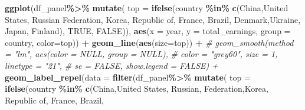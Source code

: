 \documentclass[
]{article}
\newenvironment{Shaded}{\begin{snugshade}}{\end{snugshade}}
\newcommand{\AttributeTok}[1]{\textcolor[rgb]{0.13,0.29,0.53}{#1}}
\newcommand{\CommentTok}[1]{\textcolor[rgb]{0.56,0.35,0.01}{\textit{#1}}}
\newcommand{\ConstantTok}[1]{\textcolor[rgb]{0.56,0.35,0.01}{#1}}
\newcommand{\FunctionTok}[1]{\textcolor[rgb]{0.13,0.29,0.53}{\textbf{#1}}}
\newcommand{\NormalTok}[1]{#1}
\newcommand{\SpecialCharTok}[1]{\textcolor[rgb]{0.81,0.36,0.00}{\textbf{#1}}}
\newcommand{\StringTok}[1]{\textcolor[rgb]{0.31,0.60,0.02}{#1}}
\begin{document}
\begin{Shaded}
\begin{Highlighting}[]
\FunctionTok{ggplot}\NormalTok{(df\_panel}\SpecialCharTok{\%\textgreater{}\%}
         \FunctionTok{mutate}\NormalTok{(}
           \AttributeTok{top =} \FunctionTok{ifelse}\NormalTok{(country }\SpecialCharTok{\%in\%} \FunctionTok{c}\NormalTok{(}\StringTok{\textquotesingle{}China\textquotesingle{}}\NormalTok{,}\StringTok{\textquotesingle{}United States\textquotesingle{}}\NormalTok{, }\StringTok{\textquotesingle{}Russian Federation\textquotesingle{}}\NormalTok{,}
                                       \StringTok{\textquotesingle{}Korea, Republic of\textquotesingle{}}\NormalTok{, }\StringTok{\textquotesingle{}France\textquotesingle{}}\NormalTok{, }\StringTok{\textquotesingle{}Brazil\textquotesingle{}}\NormalTok{,}
                                       \StringTok{\textquotesingle{}Denmark\textquotesingle{}}\NormalTok{,}\StringTok{\textquotesingle{}Ukraine\textquotesingle{}}\NormalTok{, }\StringTok{\textquotesingle{}Japan\textquotesingle{}}\NormalTok{, }\StringTok{\textquotesingle{}Finland\textquotesingle{}}\NormalTok{), }\ConstantTok{TRUE}\NormalTok{, }\ConstantTok{FALSE}\NormalTok{)),}
       \FunctionTok{aes}\NormalTok{(}\AttributeTok{x =}\NormalTok{ year, }\AttributeTok{y =}\NormalTok{ total\_earnings, }\AttributeTok{group =}\NormalTok{ country, }\AttributeTok{color=}\NormalTok{top)) }\SpecialCharTok{+}
  \FunctionTok{geom\_line}\NormalTok{(}\FunctionTok{aes}\NormalTok{(}\AttributeTok{size=}\NormalTok{top)) }\SpecialCharTok{+}
  \CommentTok{\# geom\_smooth(method = "lm", aes(color = NULL, group = NULL), }
  \CommentTok{\#             color = "grey60", size = 1, linetype = "21",}
  \CommentTok{\#             se = FALSE, show.legend = FALSE) +}
  \FunctionTok{geom\_label\_repel}\NormalTok{(}\AttributeTok{data =} \FunctionTok{filter}\NormalTok{(df\_panel}\SpecialCharTok{\%\textgreater{}\%}
                                   \FunctionTok{mutate}\NormalTok{(}
                                     \AttributeTok{top =} \FunctionTok{ifelse}\NormalTok{(country }\SpecialCharTok{\%in\%} \FunctionTok{c}\NormalTok{(}\StringTok{\textquotesingle{}China\textquotesingle{}}\NormalTok{,}\StringTok{\textquotesingle{}United States\textquotesingle{}}\NormalTok{, }\StringTok{\textquotesingle{}Russian\textquotesingle{}}\NormalTok{, }\StringTok{\textquotesingle{}Federation\textquotesingle{}}\NormalTok{,}\StringTok{\textquotesingle{}Korea, Republic of\textquotesingle{}}\NormalTok{, }\StringTok{\textquotesingle{}France\textquotesingle{}}\NormalTok{, }\StringTok{\textquotesingle{}Brazil\textquotesingle{}}\NormalTok{,}

\end{Highlighting}
\end{Shaded}
\end{document}
